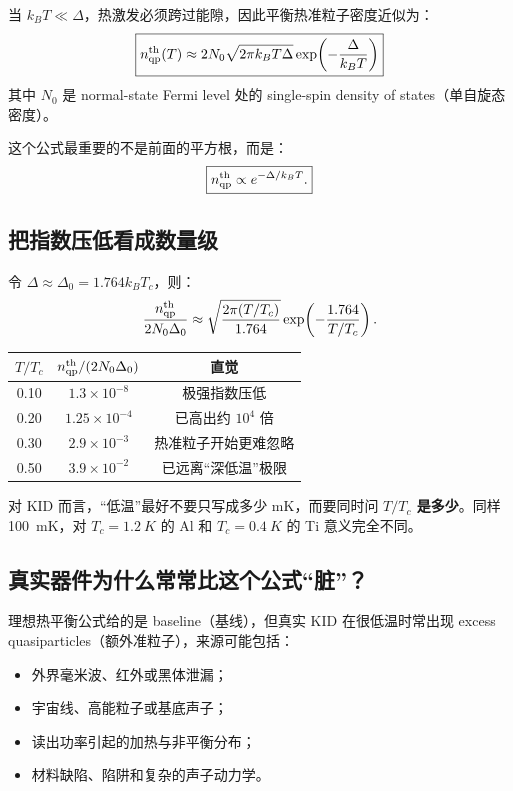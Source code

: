 \documentclass[11pt,a4paper,openany]{ctexrep}
\newcommand{\qp}{\mathrm{qp}}
\begin{document}
当 $k_BT\ll\Delta$，热激发必须跨过能隙，因此平衡热准粒子密度近似为：
\[
\boxed{
n_{\qp}^{\rm th}(T)
\approx
2N_0\sqrt{2\pi k_BT\Delta}
\exp\!\left(-\frac{\Delta}{k_BT}\right)
}
\]
其中 $N_0$ 是 normal-state Fermi level 处的 single-spin density of states（单自旋态密度）。

这个公式最重要的不是前面的平方根，而是：
\[
\boxed{n_{\qp}^{\rm th}\propto e^{-\Delta/k_BT}.}
\]

\subsection{把指数压低看成数量级}
令 $\Delta\approx\Delta_0=1.764k_BT_c$，则：
\[
\frac{n_{\qp}^{\rm th}}{2N_0\Delta_0}
\approx
\sqrt{\frac{2\pi(T/T_c)}{1.764}}
\exp\!\left(-\frac{1.764}{T/T_c}\right).
\]

\begin{center}
\begin{tabular}{ccc}
\toprule
$T/T_c$ & $n_{\qp}^{\rm th}/(2N_0\Delta_0)$ & 直觉 \\
\midrule
0.10 & $1.3\times10^{-8}$ & 极强指数压低 \\
0.20 & $1.25\times10^{-4}$ & 已高出约 $10^4$ 倍 \\
0.30 & $2.9\times10^{-3}$ & 热准粒子开始更难忽略 \\
0.50 & $3.9\times10^{-2}$ & 已远离“深低温”极限 \\
\bottomrule
\end{tabular}
\end{center}

\begin{intuitionbox}
对 KID 而言，“低温”最好不要只写成多少 mK，而要同时问 \textbf{$T/T_c$ 是多少}。同样 \SI{100}{mK}，对 $T_c=\SI{1.2}{K}$ 的 Al 和 $T_c=\SI{0.4}{K}$ 的 Ti 意义完全不同。
\end{intuitionbox}

\subsection{真实器件为什么常常比这个公式“脏”？}
理想热平衡公式给的是 baseline（基线），但真实 KID 在很低温时常出现 excess quasiparticles（额外准粒子），来源可能包括：
\begin{itemize}
  \item 外界毫米波、红外或黑体泄漏；
  \item 宇宙线、高能粒子或基底声子；
  \item 读出功率引起的加热与非平衡分布；
  \item 材料缺陷、陷阱和复杂的声子动力学。
\end{itemize}
\end{document}
